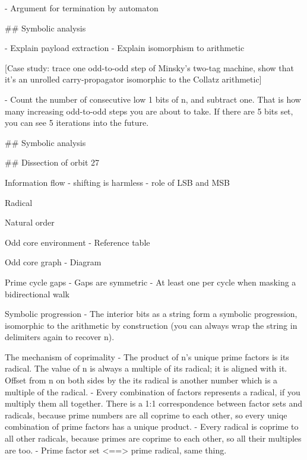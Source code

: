 \documentclass[12pt]{article}
\theoremstyle{plain}
\theoremstyle{definition}
\begin{document}
- Argument for termination by automaton

## Symbolic analysis

- Explain payload extraction
- Explain isomorphism to arithmetic

[Case study: trace one odd-to-odd step of Minsky's two-tag machine, show that it's an unrolled carry-propagator isomorphic to the Collatz arithmetic]






- Count the number of consecutive low 1 bits of n, and subtract one. That is how many increasing odd-to-odd steps you are about to take. If there are 5 bits set, you can see 5 iterations into the future. 



## Symbolic analysis



## Dissection of orbit 27









Information flow
- shifting is harmless
- role of LSB and MSB


Radical 

Natural order







Odd core environment
- Reference table

Odd core graph
- Diagram


Prime cycle gaps
- Gaps are symmetric
- At least one per cycle when masking a bidirectional walk




\newpage






Symbolic progression
- The interior bits as a string form a symbolic progression, isomorphic to the arithmetic by construction (you can always wrap the string in delimiters again to recover n).



The mechanism of coprimality
- The product of n's unique prime factors is its radical. The value of n is always a multiple of its radical; it is aligned with it. Offset from n on both sides by the its radical is another number which is a multiple of the radical.
- Every combination of factors represents a radical, if you multiply them all together. There is a 1:1 correspondence between factor sets and radicals, because prime numbers are all coprime to each other, so every uniqe combination of prime factors has a unique product.
- Every radical is coprime to all other radicals, because primes are coprime to each other, so all their multiples are too.
- Prime factor set <==> prime radical, same thing.
\end{document}
